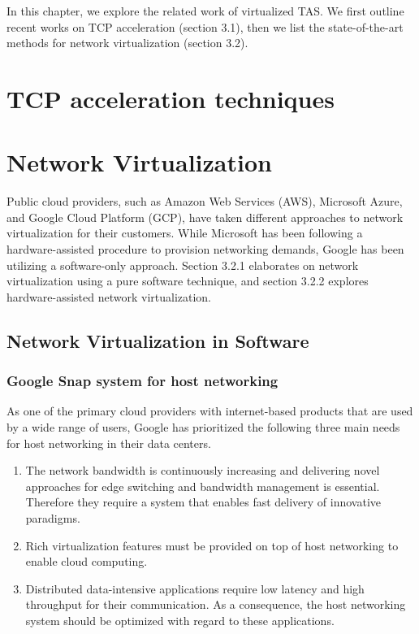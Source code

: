  In this chapter, we explore the related work of virtualized TAS. We first outline recent 
 works on TCP acceleration (section 3.1), then we list the state-of-the-art methods for network virtualization (section 3.2).



\section{TCP acceleration techniques}


\section{Network Virtualization}
Public cloud providers, such as Amazon Web Services (AWS), Microsoft Azure, 
and Google Cloud Platform (GCP), have taken different approaches to network 
virtualization for their customers. While Microsoft has been following a 
hardware-assisted procedure to provision networking demands, Google has been 
utilizing a software-only approach. Section 3.2.1 elaborates on network 
virtualization using a pure software technique, and section 3.2.2 explores 
hardware-assisted network virtualization.


\subsection{Network Virtualization in Software}


\subsubsection{Google Snap system for host networking}

As one of the primary cloud providers with internet-based products 
that are used by a wide range of users, Google has prioritized 
the following three main needs for host networking in their data centers. 

\begin{enumerate}
    \item The network bandwidth is continuously increasing and delivering 
    novel approaches for edge switching and bandwidth management 
    is essential. Therefore they require a system that enables 
    fast delivery of innovative paradigms.
    \item Rich virtualization features must be provided on top of 
    host networking to enable cloud computing.
    \item Distributed data-intensive applications require low latency 
    and high throughput for their communication. As a consequence, the 
    host networking system should be optimized with regard to these applications.
\end{enumerate}

